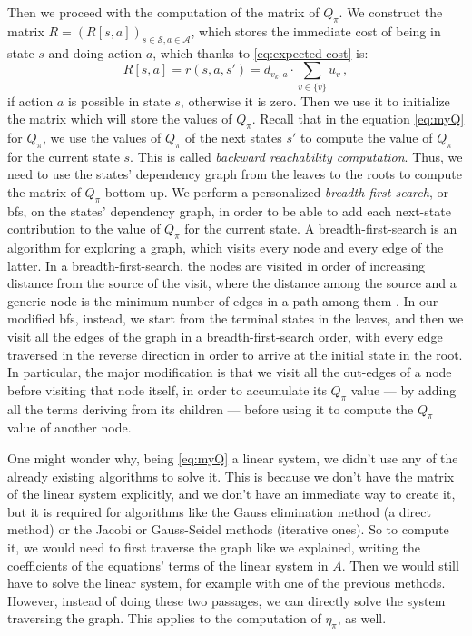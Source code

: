 Then we proceed with the computation of the matrix of $Q_\pi$. We construct the matrix $R = (R[s,a])_{s \in \mathcal S, a \in \mathcal A}$, which stores the immediate cost of being in state $s$ and doing action $a$, which thanks to \eqref{eq:expected-cost} is:
\begin{equation}
    R[s,a] = r(s,a,s') = d_{v_k, a} \cdot \sum_{v \in \{v\}} u_v \, ,
\end{equation}
if action $a$ is possible in state $s$, otherwise it is zero. Then we use it to initialize the matrix which will store the values of $Q_\pi$. Recall that in the equation \eqref{eq:myQ} for $Q_\pi$, we use the values of $Q_\pi$ of the next states $s'$ to compute the value of $Q_\pi$ for the current state $s$. This is called \emph{backward reachability computation}. Thus, we need to use the states' dependency graph from the leaves to the roots to compute the matrix of $Q_\pi$ bottom-up. We perform a personalized \emph{breadth-first-search}, or \acrshort{bfs}, on the states' dependency graph, in order to be able to add each next-state contribution to the value of $Q_\pi$ for the current state. A breadth-first-search is an algorithm for exploring a graph, which visits every node and every edge of the latter. In a breadth-first-search, the nodes are visited in order of increasing distance from the source of the visit, where the distance among the source and a generic node is the minimum number of edges in a path among them \cite{Montresor2014}. In our modified \acrshort{bfs}, instead, we start from the terminal states in the leaves, and then we visit all the edges of the graph in a breadth-first-search order, with every edge traversed in the reverse direction in order to arrive at the initial state in the root. In particular, the major modification is that we visit all the out-edges of a node before visiting that node itself, in order to accumulate its $Q_\pi$ value --- by adding all the terms deriving from its children --- before using it to compute the $Q_\pi$ value of another node.

One might wonder why, being \eqref{eq:myQ} a linear system, we didn't use any of the already existing algorithms to solve it. This is because we don't have the matrix of the linear system explicitly, and we don't have an immediate way to create it, but it is required for algorithms like the Gauss elimination method (a direct method) or the Jacobi or Gauss-Seidel methods (iterative ones). So to compute it, we would need to first traverse the graph like we explained, writing the coefficients of the equations' terms of the linear system in $A$. Then we would still have to solve the linear system, for example with one of the previous methods. However, instead of doing these two passages, we can directly solve the system traversing the graph. This applies to the computation of $\eta_\pi$, as well.

